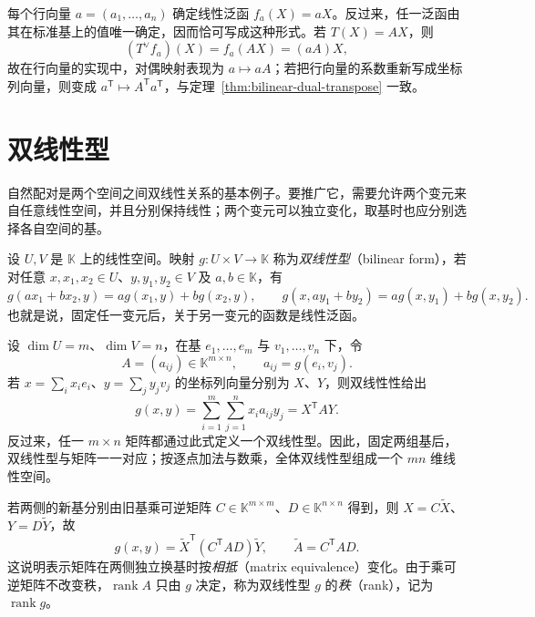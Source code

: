 \begin{solve}
每个行向量 $a=(a_1,\ldots,a_n)$ 确定线性泛函 $f_a(X)=aX$。反过来，任一泛函由其在标准基上的值唯一确定，因而恰可写成这种形式。若 $T(X)=AX$，则
\[
    (T^\vee f_a)(X)=f_a(AX)=(aA)X,
\]
故在行向量的实现中，对偶映射表现为 $a\mapsto aA$；若把行向量的系数重新写成坐标列向量，则变成 $a^{\mathsf T}\mapsto A^{\mathsf T}a^{\mathsf T}$，与定理~\ref{thm:bilinear-dual-transpose} 一致。
\end{solve}

\section{双线性型}
\label{sec:bilinear-forms}

自然配对是两个空间之间双线性关系的基本例子。要推广它，需要允许两个变元来自任意线性空间，并且分别保持线性；两个变元可以独立变化，取基时也应分别选择各自空间的基。

\begin{definition}
\label{def:bilinear-form}
设 $U,V$ 是 $\mathbb K$ 上的线性空间。映射 $g:U\times V\to\mathbb K$ 称为\emph{双线性型}（bilinear form），若对任意 $x,x_1,x_2\in U$、$y,y_1,y_2\in V$ 及 $a,b\in\mathbb K$，有
\[
    g(ax_1+bx_2,y)=ag(x_1,y)+bg(x_2,y),
    \qquad
    g(x,ay_1+by_2)=ag(x,y_1)+bg(x,y_2).
\]
也就是说，固定任一变元后，关于另一变元的函数是线性泛函。
\end{definition}

设 $\dim U=m$、$\dim V=n$，在基 $e_1,\ldots,e_m$ 与 $v_1,\ldots,v_n$ 下，令
\[
    A=(a_{ij})\in\mathbb K^{m\times n},\qquad a_{ij}=g(e_i,v_j).
\]
若 $x=\sum_i x_i e_i$、$y=\sum_j y_j v_j$ 的坐标列向量分别为 $X$、$Y$，则双线性性给出
\begin{equation}
\label{eq:bilinear-matrix-representation}
    g(x,y)=\sum_{i=1}^m\sum_{j=1}^n x_i a_{ij}y_j
    =X^{\mathsf T}AY.
\end{equation}
反过来，任一 $m\times n$ 矩阵都通过此式定义一个双线性型。因此，固定两组基后，双线性型与矩阵一一对应；按逐点加法与数乘，全体双线性型组成一个 $mn$ 维线性空间。

若两侧的新基分别由旧基乘可逆矩阵 $C\in\mathbb K^{m\times m}$、$D\in\mathbb K^{n\times n}$ 得到，则 $X=C\widetilde X$、$Y=D\widetilde Y$，故
\begin{equation}
\label{eq:bilinear-two-basis-change}
    g(x,y)=\widetilde X^{\mathsf T}(C^{\mathsf T}AD)\widetilde Y,
    \qquad \widetilde A=C^{\mathsf T}AD.
\end{equation}
这说明表示矩阵在两侧独立换基时按\emph{相抵}（matrix equivalence）变化。由于乘可逆矩阵不改变秩，$\operatorname{rank}A$ 只由 $g$ 决定，称为双线性型 $g$ 的\emph{秩}（rank），记为 $\operatorname{rank}g$。

